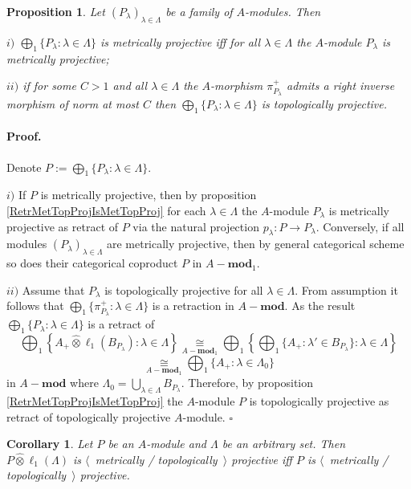 \documentclass[12pt]{article}
\newcommand{\projtens}{\mathbin{\widehat{\otimes}}}
\newcommand{\isom}[1]{\mathop{\mathbin{\cong}}\limits_{#1}}
\newtheorem{proposition}[theorem]{Proposition}
\newtheorem{corollary}[theorem]{Corollary}
\renewenvironment{proof}{\paragraph{Proof.}}{\hfill$\square$\medskip}
\begin{document}
\begin{proposition}\label{MetTopProjModCoprod} Let $(P_\lambda)_{\lambda\in\Lambda}$ be a family of $A$-modules. Then 

$i)$ $\bigoplus_1\{P_\lambda:\lambda\in\Lambda\}$ is metrically projective iff for all $\lambda\in\Lambda$ the $A$-module $P_\lambda$ is metrically projective;

$ii)$ if for some $C>1$ and all $\lambda\in\Lambda$ the $A$-morphism $\pi_{P_\lambda}^+$ admits a right inverse morphism of norm at most $C$ then $\bigoplus_1\{P_\lambda:\lambda\in\Lambda\}$ is topologically projective.
\end{proposition}
\begin{proof} Denote $P:=\bigoplus_1\{P_\lambda:\lambda\in\Lambda\}$.

$i)$ If $P$ is metrically projective, then by proposition \ref{RetrMetTopProjIsMetTopProj} for each $\lambda\in\Lambda$ the $A$-module $P_\lambda$ is metrically projective as retract of $P$ via the natural projection $p_\lambda:P\to P_\lambda$. Conversely, if all modules $(P_\lambda)_{\lambda\in\Lambda}$ are metrically projective, then by general categorical scheme so does their categorical coproduct $P$ in $A-\mathbf{mod}_1$.

$ii)$ Assume that $P_\lambda$ is topologically projective for all $\lambda\in\Lambda$. From assumption it follows that $\bigoplus_1\{\pi_{P_\lambda}^+:\lambda\in\Lambda\}$ is a retraction in $A-\mathbf{mod}$. As the result $\bigoplus_1\{P_\lambda:\lambda\in\Lambda\}$ is a retract of 
$$
\bigoplus\nolimits_1\left\{A_+\projtens \ell_1(B_{P_\lambda}):\lambda\in\Lambda\right\}
\isom{A-\mathbf{mod}_1}
\bigoplus\nolimits_1\left\{\bigoplus\nolimits_1\{A_+:\lambda'\in B_{P_\lambda}\}:\lambda\in\Lambda\right\}
$$
$$
\isom{A-\mathbf{mod}_1}
\bigoplus\nolimits_1\{A_+:\lambda\in\Lambda_0\}
$$
in $A-\mathbf{mod}$ where $\Lambda_0=\bigcup_{\lambda\in\Lambda}B_{P_\lambda}$. Therefore, by proposition \ref{RetrMetTopProjIsMetTopProj} the $A$-module $P$ is topologically projective as retract of  topologically projective $A$-module.
\end{proof}

\begin{corollary}\label{MetTopProjTensProdWithl1} Let $P$ be an $A$-module and $\Lambda$ be an arbitrary set. Then $P\projtens \ell_1(\Lambda)$ is $\langle$~metrically / topologically~$\rangle$ projective iff $P$ is $\langle$~metrically / topologically~$\rangle$ projective.
\end{corollary}
\end{document}
